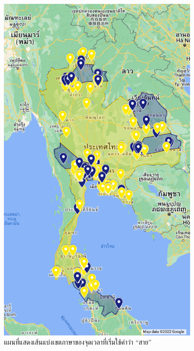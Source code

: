 \documentclass[a4paper]{article}
\begin{document}
\begin{figure}[!ht]
\begin{center}
        \begin{minipage}{0.45\textwidth}
            \includegraphics[width=0.9\textwidth]{map_with_dot}
        \end{minipage}
        \end{center}
        \caption{แผนที่แสดงเส้นแบ่งเขตภาษาของจุดเวลาที่เริ่มใช้คำว่า “สาย”}
    \end{figure}
\end{document}
